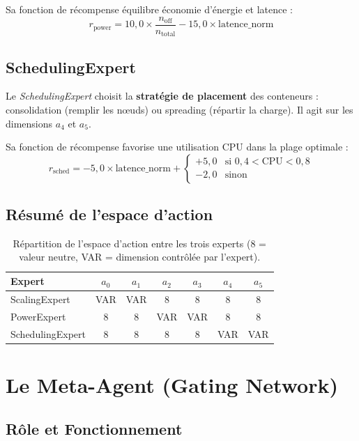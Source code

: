 Sa fonction de récompense équilibre économie d'énergie et latence :
\[
r_{\text{power}} = 10{,}0 \times \frac{n_{\text{off}}}{n_{\text{total}}}
                 - 15{,}0 \times \text{latence\_norm}
\]

\subsection{SchedulingExpert}

Le \textit{SchedulingExpert} choisit la \textbf{stratégie de placement}
des conteneurs : consolidation (remplir les nœuds) ou spreading (répartir
la charge). Il agit sur les dimensions $a_4$ et $a_5$.

Sa fonction de récompense favorise une utilisation CPU dans la plage optimale :
\[
r_{\text{sched}} = -5{,}0 \times \text{latence\_norm}
+ \begin{cases} +5{,}0 & \text{si } 0{,}4 < \text{CPU} < 0{,}8 \\ -2{,}0 & \text{sinon} \end{cases}
\]

\subsection{Résumé de l'espace d'action}

\begin{table}[h]
\centering
\begin{tabular}{|l|c|c|c|c|c|c|}
\hline
\textbf{Expert} & $a_0$ & $a_1$ & $a_2$ & $a_3$ & $a_4$ & $a_5$ \\
\hline
ScalingExpert   & VAR & VAR & 8 & 8 & 8 & 8 \\
PowerExpert     & 8 & 8 & VAR & VAR & 8 & 8 \\
SchedulingExpert & 8 & 8 & 8 & 8 & VAR & VAR \\
\hline
\end{tabular}
\caption{Répartition de l'espace d'action entre les trois experts
(8 = valeur neutre, VAR = dimension contrôlée par l'expert).}
\label{tab:action_space}
\end{table}

\section{Le Meta-Agent (Gating Network)}

\subsection{Rôle et Fonctionnement}

